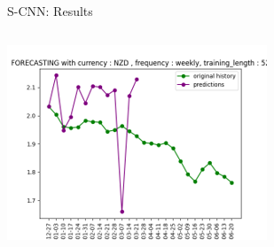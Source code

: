 \documentclass[aspectratio=169, 12pt]{beamer}
\begin{document}
\begin{frame}[allowframebreaks]{S-CNN: Results}
\begin{columns}
\begin{column}{0.25\textwidth}
        \includegraphics[width=\linewidth]{plots/r4.png}
    \end{column}
\end{columns}
\newpage


\end{frame}
\end{document}
